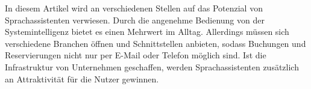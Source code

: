 In diesem Artikel wird an verschiedenen Stellen auf das Potenzial von Sprachassistenten verwiesen. Durch die angenehme Bedienung von der Systemintelligenz bietet es einen Mehrwert im Alltag. Allerdings müssen sich verschiedene Branchen öffnen und Schnittstellen anbieten, sodass Buchungen und Reservierungen nicht nur per E-Mail oder Telefon möglich sind. Ist die Infrastruktur von Unternehmen geschaffen, werden Sprachassistenten zusätzlich an Attraktivität für die Nutzer gewinnen.